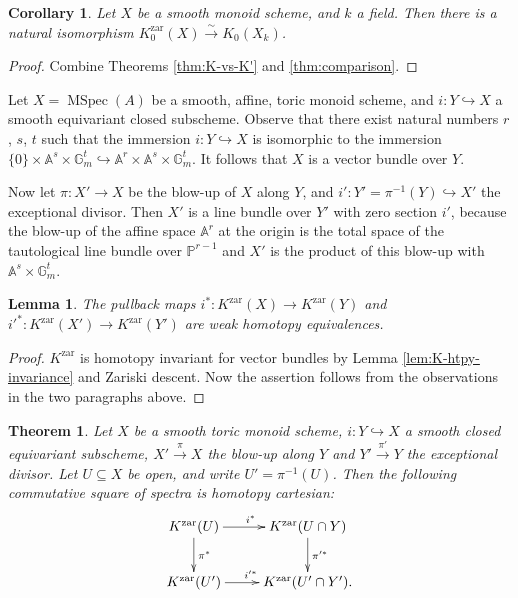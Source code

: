 \documentclass[12pt]{amsart}
\def\Kzar{K^{\mathrm{zar}}}
\newcommand{\A}{\mathbb{A}}
\newcommand{\G}{\mathbb{G}}
\newcommand{\bbP}{\mathbb{P}}
\def\MSpec{\operatorname{MSpec}}
\numberwithin{equation}{section}
\theoremstyle{plain}
\newtheorem{thm}[equation]{Theorem}
\newtheorem{lem}[equation]{Lemma}
\newtheorem{cor}[equation]{Corollary}
\theoremstyle{definition}
\theoremstyle{remark}
\begin{document}
\begin{cor}\label{cor:K_0}
	Let $X$ be a smooth monoid scheme, and $k$ a field. Then there is a natural isomorphism
	$\Kzar_0(X)\xrightarrow{\sim} K_0(X_k)$.
\end{cor}

\begin{proof}
	Combine Theorems \ref{thm:K-vs-K'} and \ref{thm:comparison}.
\end{proof}

Let $X = \MSpec (A)$ be a smooth, affine, toric monoid scheme, 
and $i:Y\hookrightarrow X$ a smooth equivariant closed subscheme. Observe that there exist natural numbers $r$, $s$, $t$ such that the immersion $i:Y\hookrightarrow X$ is isomorphic to the immersion $\{0\}\times \A^s\times \G_m^t \hookrightarrow \A^r\times \A^s\times \G_m^t$. It follows that $X$ is a vector bundle over $Y$.

Now let $\pi: X'\to X$ be the blow-up of $X$ along $Y$, and $i':Y' = \pi^{-1}(Y)\hookrightarrow X'$ the exceptional divisor. Then $X'$ is a line bundle over $Y'$ with zero section $i'$,
 because the blow-up of the affine space $\A^r$ at the origin is the total space of the tautological line bundle over $\bbP^{r-1}$ and $X'$ is the product of this blow-up with $\A^s\times \G_m^t.$ 


\begin{lem}\label{lem:local-embedding}
	The pullback maps $i^*:\Kzar(X)\to \Kzar(Y)$ and $i'^*:\Kzar(X')\to \Kzar(Y')$ are weak
	 homotopy equivalences. 
\end{lem}

\begin{proof}
	$\Kzar$ is homotopy invariant for vector bundles by Lemma \ref{lem:K-htpy-invariance} and Zariski descent. Now the
	 assertion follows from the observations in the two paragraphs above.
\end{proof}

\goodbreak
\begin{thm}\label{thm:scdh-descent}
	Let $X$ be a smooth toric monoid scheme, $i:Y\hookrightarrow X$ a smooth closed equivariant subscheme, $X'\xrightarrow{\pi} X$ the blow-up along $Y$ and $Y'\xrightarrow{\pi'} Y$ the exceptional divisor. Let $U\subseteq X$ be open,
	 and write $U' = \pi^{-1}(U)$. Then the following commutative square of spectra is homotopy cartesian:
	\begin{equation}\label{MV-square}
		\xymatrix{
			\Kzar(U)  \ar[r]^{i^*}\ar[d]^{\pi^*}&
			\Kzar(U\cap Y) \ar[d]^{\pi'^*} 
			\\
			\Kzar(U')  \ar[r]^{i'^*}& \Kzar(U'\cap Y').
		}
	\end{equation}
\end{thm}
\end{document}
